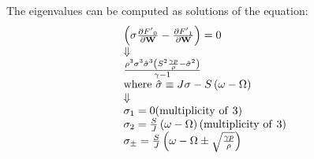 The eigenvalues can be computed as solutions of the equation: 
\begin{equation}
\label{eq:UCS-eigenvalues}
\begin{array}{l}
\left( {\sigma \frac{{\partial {{F'}_0}}}{{\partial {\bf{W}}}} - \frac{{\partial {{F'}_1}}}{{\partial {\bf{W}}}}} \right) = 0\\
 \Downarrow \\
\frac{{{\rho ^3}{\sigma ^3}{{\hat \sigma }^3}\left( {{S^2}\frac{{\gamma p}}{\rho } - {{\hat \sigma }^2}} \right)}}{{\gamma  - 1}}\\
{\rm{where }~}\hat \sigma  \equiv J\sigma  - S\left( {\omega  - \Omega } \right)\\
 \Downarrow \\
{\sigma _1} = 0{\rm{ (multiplicity~ of~ 3)}}\\
{\sigma _2} = \frac{S}{J}\left( {\omega  - \Omega } \right){\rm{ (multiplicity~ of~ 3)}}\\
{\sigma _ \pm } = \frac{S}{J}\left( {\omega  - \Omega  \pm \sqrt {\frac{{\gamma p}}{\rho }} } \right)
\end{array}
\end{equation}


